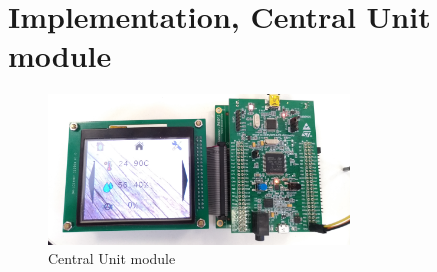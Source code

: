\section{Implementation, Central Unit module}
\begin{figure}[H]
	\centering
	\includegraphics[width=8cm,keepaspectratio]{img/CentralUnit}
	\caption{Central Unit module}
	\label{fig:CentralUnit}
\end{figure}

